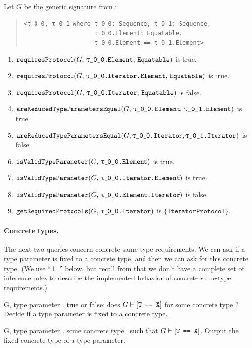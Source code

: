 \documentclass[../generics]{subfiles}
\begin{document}
\begin{example}
Let $G$ be the generic signature from :
\begin{quote}
\begin{verbatim}
<τ_0_0, τ_0_1 where τ_0_0: Sequence, τ_0_1: Sequence,
                    τ_0_0.Element: Equatable,
                    τ_0_0.Element == τ_0_1.Element>
\end{verbatim}
\end{quote}
\begin{enumerate}
\item $\Query{requiresProtocol}{G,\, \texttt{\rT.Element},\,\texttt{Equatable}}$ is true.
\item $\Query{requiresProtocol}{G,\, \texttt{\rT.Iterator.Element},\, \texttt{Equatable}}$ is true.
\item $\Query{requiresProtocol}{G,\, \texttt{\rT.Iterator},\, \texttt{Equatable}}$ is false.
\item $\Query{areReducedTypeParametersEqual}{G,\, \texttt{\rT.Element},\, \texttt{\rU.Element}}$ is true.
\item $\Query{areReducedTypeParametersEqual}{G, \texttt{\rT.Iterator}, \texttt{\rU.Iterator}}$ is false.
\item $\Query{isValidTypeParameter}{G,\, \texttt{\rT.Element}}$ is true.
\item $\Query{isValidTypeParameter}{G,\, \texttt{\rT.Iterator.Element}}$ is true.
\item $\Query{isValidTypeParameter}{G,\, \texttt{\rT.Element.Iterator}}$ is false.
\item $\Query{getRequiredProtocols}{G,\, \texttt{\rT.Iterator}}$ is $\{\texttt{IteratorProtocol}\}$.
\end{enumerate}
\end{example}

\paragraph{Concrete types.} The next two queries concern concrete same-type requirements. We can ask if a type parameter is fixed to a concrete type, and then we can ask for this concrete type. (We use ``$\vdash$'' below, but recall from  that we don't have a complete set of inference rules to describe the implemented behavior of concrete same-type requirements.)

\begin{itemize}
{G, \tT}
{type parameter \tT.}
{true or false: does $G\vdash[\texttt{T == X}]$ for some concrete type \tX?}
{Decide if a type parameter is fixed to a concrete type.}

{G, \tT}
{type parameter \tT.}
{some concrete type \tX\ such that $G\vdash[\texttt{T == X}]$.}
{Output the fixed concrete type of a type parameter.}
\end{itemize}
\end{document}
